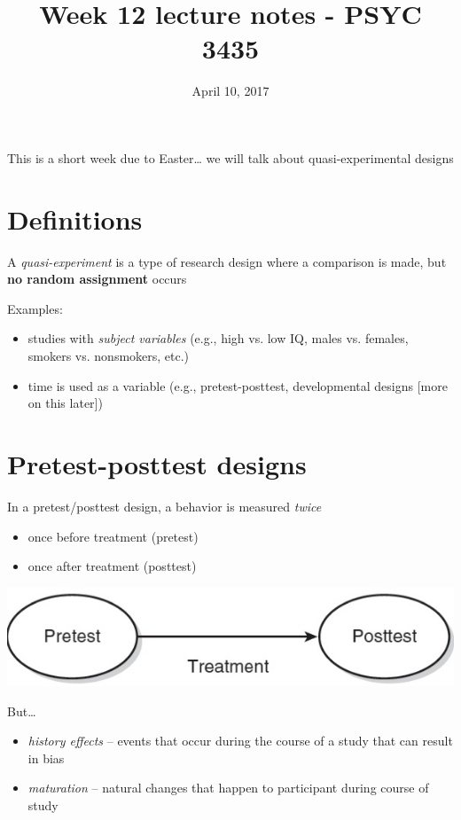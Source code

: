 \documentclass[11pt]{article}
\date{April 10, 2017}
\title{Week 12 lecture notes - PSYC 3435}
\begin{document}
\maketitle
This is a short week due to Easter\ldots{} we will talk about quasi-experimental designs

\section*{Definitions}
\label{sec-1}

A \emph{quasi-experiment} is a type of research design where a comparison is made, but \textbf{no random assignment} occurs

Examples:
\begin{itemize}
\item studies with \emph{subject variables} (e.g., high vs. low IQ, males vs. females, smokers vs. nonsmokers, etc.)
\item time is used as a variable (e.g., pretest-posttest, developmental designs [more on this later])
\end{itemize}

\section*{Pretest-posttest designs}
\label{sec-2}

In a pretest/posttest design, a behavior is measured \emph{twice}
\begin{itemize}
\item once before treatment (pretest)
\item once after treatment (posttest)
\end{itemize}

\includegraphics[width=.9\linewidth]{figures/prePost.jpg}

But\ldots{}
\begin{itemize}
\item \emph{history effects} -- events that occur during the course of a study that can result in bias
\item \emph{maturation} -- natural changes that happen to participant during course of study
\end{itemize}
\end{document}
